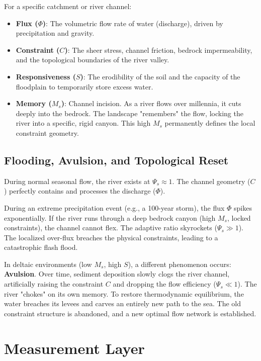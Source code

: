 \documentclass[11pt,a4paper]{article}
\begin{document}
For a specific catchment or river channel:
\begin{itemize}
    \item \textbf{Flux ($\Phi$)}: The volumetric flow rate of water (discharge), driven by precipitation and gravity.
    \item \textbf{Constraint ($C$)}: The sheer stress, channel friction, bedrock impermeability, and the topological boundaries of the river valley.
    \item \textbf{Responsiveness ($S$)}: The erodibility of the soil and the capacity of the floodplain to temporarily store excess water.
    \item \textbf{Memory ($M_s$)}: Channel incision. As a river flows over millennia, it cuts deeply into the bedrock. The landscape "remembers" the flow, locking the river into a specific, rigid canyon. This high $M_s$ permanently defines the local constraint geometry.
\end{itemize}

\subsection{Flooding, Avulsion, and Topological Reset}
During normal seasonal flow, the river exists at $\Psi_s \approx 1$. The channel geometry ($C$) perfectly contains and processes the discharge ($\Phi$).

During an extreme precipitation event (e.g., a 100-year storm), the flux $\Phi$ spikes exponentially. If the river runs through a deep bedrock canyon (high $M_s$, locked constraints), the channel cannot flex. The adaptive ratio skyrockets ($\Psi_s \gg 1$). The localized over-flux breaches the physical constraints, leading to a catastrophic flash flood.

In deltaic environments (low $M_s$, high $S$), a different phenomenon occurs: \textbf{Avulsion}. Over time, sediment deposition slowly clogs the river channel, artificially raising the constraint $C$ and dropping the flow efficiency ($\Psi_s \ll 1$). The river "chokes" on its own memory. To restore thermodynamic equilibrium, the water breaches its levees and carves an entirely new path to the sea. The old constraint structure is abandoned, and a new optimal flow network is established.



\section{Measurement Layer}
\end{document}
